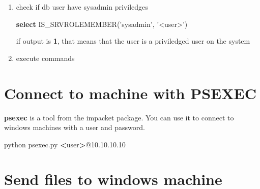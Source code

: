 \documentclass{assets/ipesethesis}
\newenvironment{Shaded}{\begin{snugshade}}{\end{snugshade}}
\newcommand{\ExtensionTok}[1]{#1}
\newcommand{\FunctionTok}[1]{\textcolor[rgb]{0.00,0.00,0.00}{#1}}
\newcommand{\KeywordTok}[1]{\textcolor[rgb]{0.13,0.29,0.53}{\textbf{#1}}}
\newcommand{\NormalTok}[1]{#1}
\newcommand{\OperatorTok}[1]{\textcolor[rgb]{0.81,0.36,0.00}{\textbf{#1}}}
\newcommand{\StringTok}[1]{\textcolor[rgb]{0.31,0.60,0.02}{#1}}
\begin{document}
\begin{enumerate}
\def\labelenumi{\arabic{enumi}.}
\item
  check if db user have sysadmin priviledges

\begin{Shaded}
\begin{Highlighting}[]
\KeywordTok{select} \ExtensionTok{IS_SRVROLEMEMBER}\NormalTok{(}\StringTok{'sysadmin'}\NormalTok{, }\StringTok{'<user>'}\NormalTok{)}
\end{Highlighting}
\end{Shaded}

  if output is \textbf{1}, that means that the user is a priviledged user on the system
\item
  execute commands

\begin{Shaded}
\end{Shaded}
\end{enumerate}

\hypertarget{connect-to-machine-with-psexec}{%
\section*{Connect to machine with PSEXEC}\label{connect-to-machine-with-psexec}}

\textbf{psexec} is a tool from the impacket package. You can use it to connect to windows machines with a user and password.

\begin{Shaded}
\begin{Highlighting}[]
\ExtensionTok{python}\NormalTok{ psexec.py }\OperatorTok{<}\NormalTok{user}\OperatorTok{>}\NormalTok{@10.10.10.10}
\end{Highlighting}
\end{Shaded}

\hypertarget{send-files-to-windows-machine}{%
\section*{Send files to windows machine}\label{send-files-to-windows-machine}}
\end{document}
